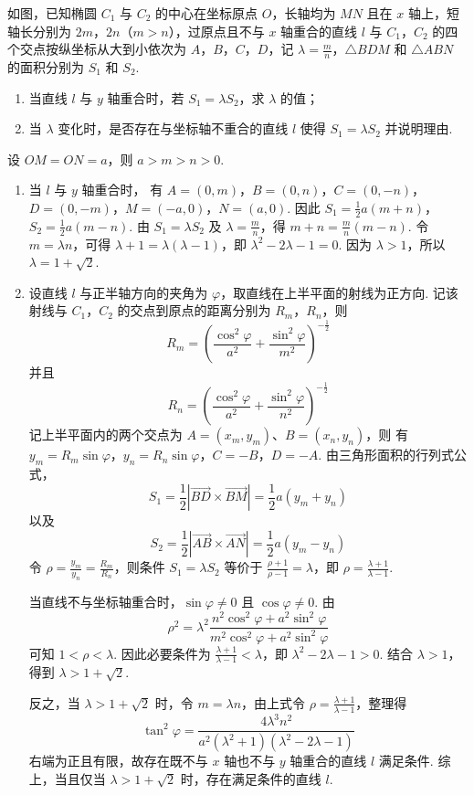 \begin{problem}
如图，已知椭圆 \(C_1\) 与 \(C_2\) 的中心在坐标原点 \(O\)，长轴均为 \(MN\) 且在 \(x\) 轴上，短轴长分别为 \(2m\)，\(2n\)（\(m > n\)），过原点且不与 \(x\) 轴重合的直线 \(l\) 与 \(C_1\)，\(C_2\) 的四个交点按纵坐标从大到小依次为 \(A\)，\(B\)，\(C\)，\(D\)，记 \(\lambda = \frac{m}{n}\)，\(\triangle BDM\) 和 \(\triangle ABN\) 的面积分别为 \(S_1\) 和 \(S_2\).
\begin{enumerate}
\item 当直线 \(l\) 与 \(y\) 轴重合时，若 \(S_{1} = \lambda S_{2}\)，求 \(\lambda\) 的值；
\item 当 \(\lambda\) 变化时，是否存在与坐标轴不重合的直线 \(l\) 使得 \(S_{1} = \lambda S_{2}\) 并说明理由.
\end{enumerate}
\end{problem}

\begin{solution}
设 \(OM=ON=a\)，则 \(a>m>n>0\).

\begin{enumerate}
\item 当 \(l\) 与 \(y\) 轴重合时，
有 \(A=(0,m)\)，\(B=(0,n)\)，\(C=(0,-n)\)，\(D=(0,-m)\)，\(M=(-a,0)\)，\(N=(a,0)\). 因此 \(S_1=\frac{1}{2}a(m+n)\)，\(S_2=\frac{1}{2}a(m-n)\). 由 \(S_1=\lambda S_2\) 及 \(\lambda=\frac{m}{n}\)，得 \(m+n=\frac{m}{n}(m-n)\).
令 \(m=\lambda n\)，可得 \(\lambda+1=\lambda(\lambda-1)\)，即 \(\lambda^2-2\lambda-1=0\).
因为 \(\lambda>1\)，所以 \(\lambda=1+\sqrt{2}\).

\item 设直线 \(l\) 与正半轴方向的夹角为 \(\varphi\)，取直线在上半平面的射线为正方向. 记该射线与 \(C_1\)，\(C_2\) 的交点到原点的距离分别为 \(R_m\)，\(R_n\)，则
\[
R_m=\left(\frac{\cos^2\varphi}{a^2}+\frac{\sin^2\varphi}{m^2}\right)^{-\frac{1}{2}}
\]
并且
\[
R_n=\left(\frac{\cos^2\varphi}{a^2}+\frac{\sin^2\varphi}{n^2}\right)^{-\frac{1}{2}}
\]
记上半平面内的两个交点为 \(A=(x_m,y_m)\)、\(B=(x_n,y_n)\)，则
有 \(y_m=R_m\sin\varphi\)，\(y_n=R_n\sin\varphi\)，\(C=-B\)，\(D=-A\).
由三角形面积的行列式公式，
\[
S_1=\frac{1}{2}\left|\overrightarrow{BD}\times\overrightarrow{BM}\right|
=\frac{1}{2}a(y_m+y_n)
\]
以及
\[
S_2=\frac{1}{2}\left|\overrightarrow{AB}\times\overrightarrow{AN}\right|
=\frac{1}{2}a(y_m-y_n)
\]
令 \(\rho=\frac{y_m}{y_n}=\frac{R_m}{R_n}\)，则条件 \(S_1=\lambda S_2\) 等价于 \(\frac{\rho+1}{\rho-1}=\lambda\)，即 \(\rho=\frac{\lambda+1}{\lambda-1}\).

当直线不与坐标轴重合时，\(\sin\varphi\neq0\) 且 \(\cos\varphi\neq0\). 由
\[
\rho^2=\lambda^2\frac{n^2\cos^2\varphi+a^2\sin^2\varphi}{m^2\cos^2\varphi+a^2\sin^2\varphi}
\]
可知 \(1<\rho<\lambda\). 因此必要条件为 \(\frac{\lambda+1}{\lambda-1}<\lambda\)，即 \(\lambda^2-2\lambda-1>0\).
结合 \(\lambda>1\)，得到 \(\lambda>1+\sqrt{2}\).

反之，当 \(\lambda>1+\sqrt{2}\) 时，令 \(m=\lambda n\)，由上式令 \(\rho=\frac{\lambda+1}{\lambda-1}\)，整理得
\[
\tan^2\varphi
=\frac{4\lambda^3n^2}{a^2(\lambda^2+1)(\lambda^2-2\lambda-1)}
\]
右端为正且有限，故存在既不与 \(x\) 轴也不与 \(y\) 轴重合的直线 \(l\) 满足条件. 综上，当且仅当 \(\lambda>1+\sqrt{2}\) 时，存在满足条件的直线 \(l\).
\end{enumerate}
\end{solution}

